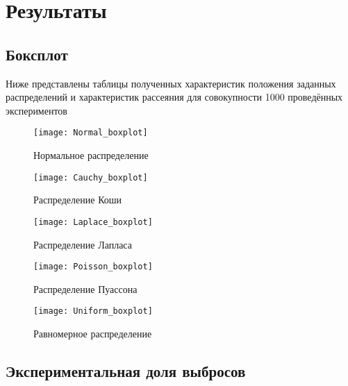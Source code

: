 \section{Результаты}
\subsection{Боксплот}
Ниже представлены таблицы полученных характеристик положения заданных распределений и характеристик рассеяния для совокупности 1000 проведённых экспериментов

\begin{figure}[H]
	\begin{center}
		\texttt{[image: Normal\_boxplot]}
		\caption{Нормальное распределение}
		\label{pic:pic_name}
	\end{center}
\end{figure}


\begin{figure}[H]
	\begin{center}
		\texttt{[image: Cauchy\_boxplot]}
		\caption{Распределение Коши}
		\label{pic:pic_name}
	\end{center}
\end{figure}


\begin{figure}[H]
	\begin{center}
		\texttt{[image: Laplace\_boxplot]}
		\caption{Распределение Лапласа}
		\label{pic:pic_name}
	\end{center}
\end{figure}

\begin{figure}[H]
	\begin{center}
		\texttt{[image: Poisson\_boxplot]}
		\caption{Распределение Пуассона}
		\label{pic:pic_name}
	\end{center}
\end{figure}

\begin{figure}[H]
	\begin{center}
		\texttt{[image: Uniform\_boxplot]}
		\caption{Равномерное распределение}
		\label{pic:pic_name}
	\end{center}
\end{figure}

\subsection{Экспериментальная доля выбросов}

